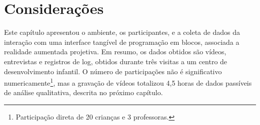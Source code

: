 \section{Considerações}

Este capítulo apresentou o ambiente, os participantes, e a coleta de dados da interação com uma interface tangível de programação em blocos, associada a realidade aumentada projetiva. Em resumo, os dados obtidos são vídeos, entrevistas e registros de log, obtidos durante três visitas a um centro de desenvolvimento infantil. O número de participações não é significativo numericamente\footnote{Participação direta de 20 crianças e 3 professoras.}, mas a gravação de vídeos totalizou 4,5 horas de dados passíveis de análise qualitativa, descrita no próximo capítulo.